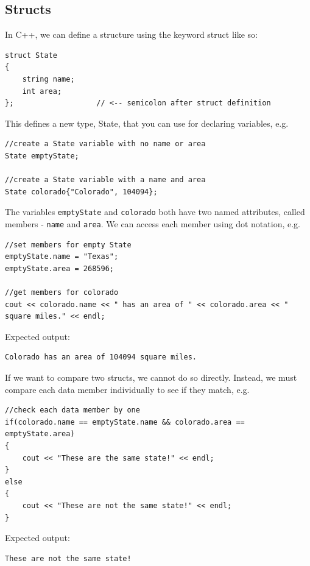 \subsection{Structs}

In C++, we can define a structure using the keyword struct like so:

\begin{verbatim}
struct State
{
    string name;
    int area;
};                   // <-- semicolon after struct definition
\end{verbatim}

This defines a new type, State, that you can use for declaring variables, e.g.

\begin{verbatim}
//create a State variable with no name or area
State emptyState;

//create a State variable with a name and area
State colorado{"Colorado", 104094};
\end{verbatim}

The variables \texttt{emptyState} and \texttt{colorado} both have two named attributes, called members - \texttt{name} and \texttt{area}. We can access each member using dot notation, e.g.

\begin{verbatim}
//set members for empty State
emptyState.name = "Texas";
emptyState.area = 268596;

//get members for colorado
cout << colorado.name << " has an area of " << colorado.area << " square miles." << endl;
\end{verbatim}

Expected output:

\begin{verbatim}
Colorado has an area of 104094 square miles.
\end{verbatim}

If we want to compare two structs, we cannot do so directly. Instead, we must compare each data member individually to see if they match, e.g.

\begin{verbatim}
//check each data member by one
if(colorado.name == emptyState.name && colorado.area == emptyState.area)
{
    cout << "These are the same state!" << endl;
}
else
{
    cout << "These are not the same state!" << endl;
}
\end{verbatim}

Expected output:

\begin{verbatim}
These are not the same state!
\end{verbatim}

